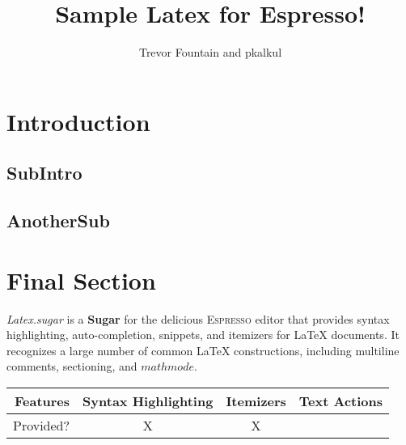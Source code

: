 \documentclass[10pt,twocolumn]{article}
\title{Sample Latex for Espresso!}
\author{Trevor Fountain and pkalkul}
\begin{document}
\maketitle

\section{Introduction}

\subsection{SubIntro}

\subsection{AnotherSub}

\section{Final Section}


\emph{Latex.sugar} is a \textbf{Sugar} for the delicious \textsc{Espresso} editor that provides syntax highlighting, auto-completion, snippets, and itemizers for LaTeX documents. It recognizes a large number of common LaTeX constructions, including multiline comments, sectioning, and $math mode$.

\begin{comment}
	See? This paragraph doesn't exist.
\end{comment}

\begin{table}[h!]
\begin{centering}
\begin{tabular}{r|c c c}
\textbf{Features} & Syntax Highlighting & Itemizers & Text Actions \\ \hline
Provided? & X & X &
\end{tabular}
\end{centering}
\end{table}
\end{document}
